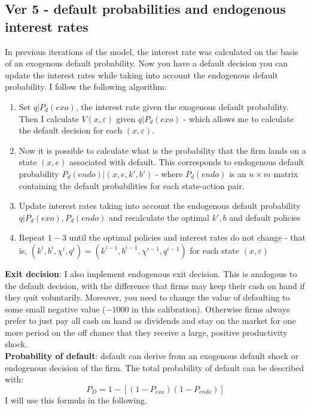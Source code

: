 \documentclass[12pt]{article}
\begin{document}
\subsection*{Ver 5 - default probabilities and endogenous interest rates}

In previous iterations of the model, the interest rate was calculated on the basis of an exogenous default probability. Now you have a default decision you can update the interest rates while taking into account the endogenous default probability. I follow the following algorithm: 
\begin{enumerate}
    \item Set $q|P_{d}(exo)$, the interest rate given the exogenous default probability. Then I calculate $V(x,\varepsilon)$ given $q|P_{d}(exo)$ - which allows me to calculate the default decision for each $(x,\varepsilon)$.
    \item Now it is possible to calculate what is the probability that the firm lands on a state $(x,e)$ associated with default. This corresponds to endogenous default probability $P_d(endo)|(x,e,k',b')$ - where $P_d(endo)$ is an $n \times m$ matrix containing the default probabilities for each state-action pair.
    \item Update interest rates taking into account the endogenous default probability $q|P_{d}(exo),P_{d}(endo)$ and recalculate the optimal $k',b$ and default policies
    \item Repeat $1-3$ until the optimal policies and interest rates do not change - that is, $ (k^{i},b^{i},\chi^{i},q^{i}) = (k^{i-1},b^{i-1},\chi^{i-1},q^{i-1}) $ for each state $(x,\varepsilon)$
\end{enumerate}
\textbf{Exit decision}: I also implement endogenous exit decision. This is analogous to the default decision, with the difference that firms may keep their cash on hand if they quit voluntarily. Moreover, you need to change the value of defaulting to some small negative value ($-1000$ in this calibration). Otherwise firms always prefer to just pay all cash on hand as dividends and stay on the market for one more period on the off chance that they receive a large, positive productivity shock. \vspace{3mm} \\
\textbf{Probability of default}: default can derive from an exogenous default shock or endogenous decision of the firm. The total probability of default can be described with:
$$             P_D = 1 - [(1 - P_{exo})(1 - P_{endo})]   $$ 
I will use this formula in the following.
\newpage
\end{document}
